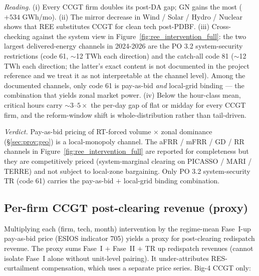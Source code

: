 \documentclass[11pt,a4paper]{article}
\begin{document}
\textit{Reading.} (i) Every CCGT firm doubles its post-DA gap; GN gains the most ($+534$ GWh/mo). (ii) The mirror decrease in Wind / Solar / Hydro / Nuclear shows that REE substitutes CCGT for clean tech post-PDBF. (iii) Cross-checking against the system view in Figure~\ref{fig:ree_intervention_full}: the two largest delivered-energy channels in 2024-2026 are the PO 3.2 system-security restrictions (code 61, $\sim$12 TWh each direction) and the catch-all code 81 ($\sim$12 TWh each direction; the latter's exact content is not documented in the project reference and we treat it as not interpretable at the channel level). Among the documented channels, only code 61 is pay-as-bid \emph{and} local-grid binding --- the combination that yields zonal market power. (iv) Below the hour-class mean, critical hours carry $\sim 3$--$5\times$ the per-day gap of flat or midday for every CCGT firm, and the reform-window shift is whole-distribution rather than tail-driven.

\textit{Verdict.} Pay-as-bid pricing of RT-forced volume $\times$ zonal dominance (\S\ref{sec:prov:geo}) is a local-monopoly channel. The aFRR / mFRR / GD / RR channels in Figure~\ref{fig:ree_intervention_full} are reported for completeness but they are competitively priced (system-marginal clearing on PICASSO / MARI / TERRE) and not subject to local-zone bargaining. Only PO 3.2 system-security TR (code 61) carries the pay-as-bid $+$ local-grid binding combination.

\subsection{Per-firm CCGT post-clearing revenue (proxy)}\label{sec:prov:phf_minus_pdbf:revenue}

Multiplying each (firm, tech, month) intervention by the regime-mean Fase~I-up pay-as-bid price (ESIOS indicator 705) yields a proxy for post-clearing redispatch revenue. The proxy sums Fase~I $+$ Fase~II $+$ TR up redispatch revenues (cannot isolate Fase~I alone without unit-level pairing). It under-attributes RES-curtailment compensation, which uses a separate price series. Big-4 CCGT only:

\begin{table}[H]
\centering\scriptsize
\caption{\textbf{Per-firm CCGT up-redispatch revenue (proxy), EUR million per regime window.} Computed as $\sum_{m \in \text{regime}}$ (intervention MWh)$_m$ $\times$ regime-mean Fase~I-up pay-as-bid price (ESIOS indicator 705). The Big-4 sum in DA15/ID15 ($\sim\texteuro 1{,}390$M) sits close to the REE-published Fase~I-up cost ($\texteuro 1{,}200$M in Table~\ref{tab:cascade_costs_official}); the $\sim 15\%$ overshoot reflects the inclusion of TR-up and Fase~II-up volumes that our PHF~$-$~PDBF gap aggregates into the same Fase~I-up multiplier.}
\label{tab:ccgt_post_clearing_rev}
\setlength{\tabcolsep}{4pt}

\end{table}
\end{document}
